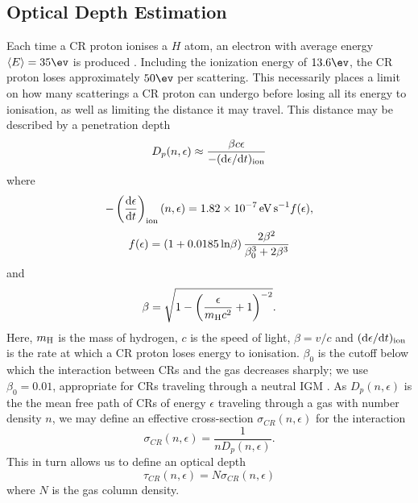\subsection{Optical Depth Estimation}
\label{attenuation}
Each time a CR proton ionises a $H$ atom, an electron with average energy $\langle E \rangle = 35\ev$ is produced \citep{SpitzerTomasko1968}.  Including the ionization energy of $13.6\ev$, the CR proton loses approximately $50\ev$ per scattering. This necessarily places a limit on how many scatterings a CR proton can undergo before losing all its energy to ionisation, as well as limiting the distance it may travel.  This distance may be described by a penetration depth 
\begin{equation}
    D_p(n, \epsilon) \approx \frac{\beta c \epsilon} {-({\rm d}\epsilon / {\rm d}t)_{\rm ion}}
\end{equation}
where \citep{Schlickeiser2002}
\begin{equation}
    - \left( \frac{{\rm d}\epsilon} {{\rm d}t} \right)_{\rm ion}(n, \epsilon)
    = 1.82\times10^{-7}\,{\rm \small eV\,s}^{-1} f(\epsilon),
\end{equation}
\begin{equation}    
    f(\epsilon) = (1 + 0.0185 \,{\rm ln}\beta )\, \frac{2 \beta^2}{\beta_0^3 + 2 \beta^3}
\end{equation}
and 
\begin{equation}
    \beta =  \sqrt{1 - \left( \frac{\epsilon}{m_{\rm \tiny H}c^2}+1 \right)^{-2}}.
\end{equation}
Here, $m_{\rm \small H}$ is the mass of hydrogen, $c$ is the speed of light, $\beta = v/c$ and $({\rm d}\epsilon / {\rm d}t)_{\rm ion}$ is the rate at which a CR proton loses energy to ionisation. $\beta_0$ is the cutoff below which the interaction between CRs and the gas decreases sharply; we use $\beta_0=0.01$, appropriate for CRs traveling through a neutral IGM \citep{StacyBromm2007}.
As $D_p(n, \epsilon)$ is the the mean free path of CRs of energy $\epsilon$ traveling through a gas with number density $n$, we may define an effective cross-section $\sigma_{CR}(n,\epsilon)$ for the interaction
\begin{equation}
\sigma_{CR}(n,\epsilon) = \frac{1}{n D_p(n, \epsilon)}.
\end{equation}
This in turn allows us to define an optical depth
\begin{equation}
\tau_{CR}(n,\epsilon) = N \sigma_{CR}(n,\epsilon)
\end{equation}
where $N$ is the gas column density.

